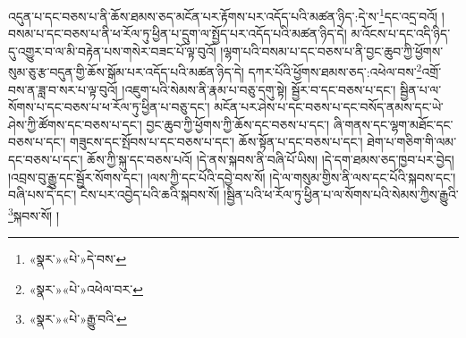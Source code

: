 འདུན་པ་དང་བཅས་པ་ནི་ཆོས་ཐམས་ཅད་མངོན་པར་རྟོགས་པར་འདོད་པའི་མཚན་ཉིད་:དེ་ས་\footnote{«སྣར་»«པེ་»དེ་བས་}དང་འདྲ་བའོ། །བསམ་པ་དང་བཅས་པ་ནི་ཕ་རོལ་ཏུ་ཕྱིན་པ་དྲུག་ལ་སྤྱོད་པར་འདོད་པའི་མཚན་ཉིད་དེ། མ་འོངས་པ་དང་འདི་ཉིད་དུ་འགྱུར་བ་ལ་མི་བརྟེན་པས་གསེར་བཟང་པོ་ལྟ་བུའོ། །ལྷག་པའི་བསམ་པ་དང་བཅས་པ་ནི་བྱང་ཆུབ་ཀྱི་ཕྱོགས་སུམ་ཅུ་རྩ་བདུན་གྱི་ཆོས་སྒོམ་པར་འདོད་པའི་མཚན་ཉིད་དེ། དཀར་པོའི་ཕྱོགས་ཐམས་ཅད་:འཕེལ་བས་\footnote{«སྣར་»«པེ་»འཕེལ་བར་}འགྲོ་བས་ན་ཟླ་བ་སར་པ་ལྟ་བུའོ། །འཇུག་པའི་སེམས་ནི་རྣམ་པ་བཅུ་དགུ་སྟེ། སྦྱོར་བ་དང་བཅས་པ་དང་། སྦྱིན་པ་ལ་སོགས་པ་དང་བཅས་པ་ཕ་རོལ་ཏུ་ཕྱིན་པ་བཅུ་དང་། མངོན་པར་ཤེས་པ་དང་བཅས་པ་དང་བསོད་ནམས་དང་ཡེ་ཤེས་ཀྱི་ཚོགས་དང་བཅས་པ་དང་། བྱང་ཆུབ་ཀྱི་ཕྱོགས་ཀྱི་ཆོས་དང་བཅས་པ་དང་། ཞི་གནས་དང་ལྷག་མཐོང་དང་བཅས་པ་དང་། གཟུངས་དང་སྤོབས་པ་དང་བཅས་པ་དང་། ཆོས་སྟོན་པ་དང་བཅས་པ་དང་། ཐེག་པ་གཅིག་གི་ལམ་དང་བཅས་པ་དང་། ཆོས་ཀྱི་སྐུ་དང་བཅས་པའོ། །དེ་ནས་སྐབས་ནི་བཞི་པོ་ཡིས། །དེ་དག་ཐམས་ཅད་ཁྱབ་པར་བྱེད། །འབྲས་བུ་རྒྱུ་དང་སྦྱོར་སོགས་དང་། །ལས་ཀྱི་དང་པོའི་དབྱེ་བས་སོ། །དེ་ལ་གསུམ་གྱིས་ནི་ལས་དང་པོའི་སྐབས་དང་། བཞི་པས་དེ་དང་། ངེས་པར་འབྱེད་པའི་ཆའི་སྐབས་སོ། །སྦྱིན་པའི་ཕ་རོལ་ཏུ་ཕྱིན་པ་ལ་སོགས་པའི་སེམས་ཀྱིས་རྒྱུའི་\footnote{«སྣར་»«པེ་»རྒྱུ་བའི་}སྐབས་སོ། །
